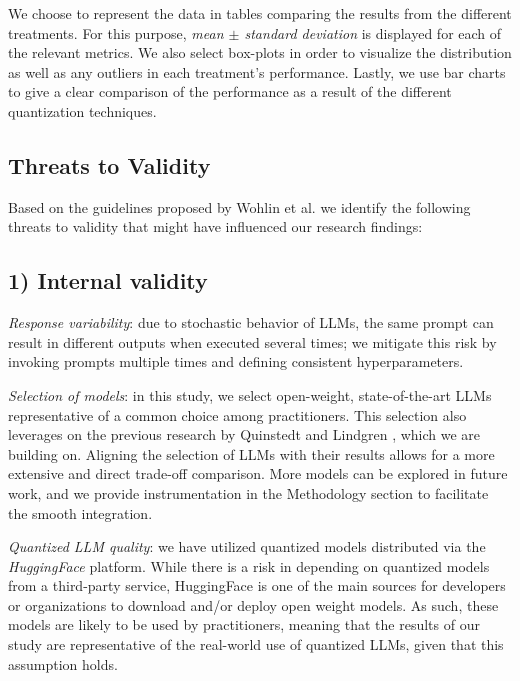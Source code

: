 \documentclass[conference]{IEEEtran}
\begin{document}
We choose to represent the data in tables comparing the results from the different treatments. For this purpose, \textit{mean $\pm$ standard deviation} is displayed for each of the relevant metrics. We also select box-plots in order to visualize the distribution as well as any outliers in each treatment's performance. Lastly, we use bar charts to give a clear comparison of the performance as a result of the different quantization techniques.

\subsection{Threats to Validity}

Based on the guidelines proposed by Wohlin et al. \cite{wohlin2012experimentation} we identify the following threats to validity that might have influenced our research findings: 
\subsection*{\textbf{1) Internal validity}}
    \textit{Response variability}: due to stochastic behavior of LLMs, the same prompt can result in different outputs when executed several times; we mitigate this risk by invoking prompts multiple times and defining consistent hyperparameters.

    \textit{Selection of models}: in this study, we select open-weight, state-of-the-art LLMs representative of a common choice among practitioners. This selection also leverages on the previous research by Quinstedt and Lindgren \cite{quinstedt2024Optimizing}, which we are building on. Aligning the selection of LLMs with their results allows for a more extensive and direct trade-off comparison. More models can be explored in future work, and we provide instrumentation in the Methodology section to facilitate the smooth integration.

    \textit{Quantized LLM quality}: we have utilized quantized models distributed via the \textit{HuggingFace} platform. While there is a risk in depending on quantized models from a third-party service, HuggingFace is one of the main sources for developers or organizations to download and/or deploy open weight models. As such, these models are likely to be used by practitioners, meaning that the results of our study are representative of the real-world use of quantized LLMs, given that this assumption holds.
\end{document}
